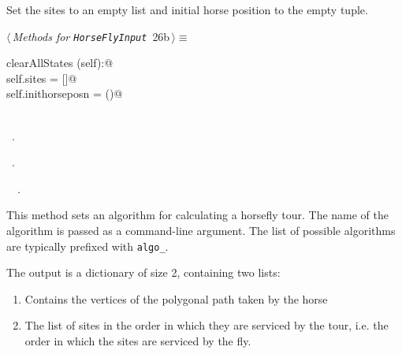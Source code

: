\documentclass[11.5pt]{report}
\begin{document}
\vspace{-0.8cm}
\newchunk Set the sites to an empty list and initial horse position to the empty tuple.
\begin{flushleft} \small\label{scrap31}\raggedright\small
{} $\langle\,${\itshape Methods for \verb|HorseFlyInput|}\nobreak\ {\footnotesize {26b}}$\,\rangle\equiv$
\vspace{-1ex}
\begin{list}{}{} \item
\mbox{}\verb@def clearAllStates (self):@\\
\mbox{}\verb@   self.sites = []@\\
\mbox{}\verb@   self.inithorseposn = ()@\\
\mbox{}\verb@@\\
\mbox{}\verb@@{\NWsep}
\end{list}
\vspace{-1.5ex}
\footnotesize
\begin{list}{}{\setlength{\itemsep}{-\parsep}\setlength{\itemindent}{-\leftmargin}}
\item \NWtxtMacroDefBy\ .
\item \NWtxtMacroRefIn\ .
\item \NWtxtIdentsDefed\nobreak\  \verb@clearAllStates@\nobreak\ .
\item{}
\end{list}
\vspace{4ex}
\end{flushleft}


\vspace{-0.8cm} \newchunk 
This method sets an algorithm for calculating
a horsefly tour. The name of the algorithm is passed as a command-line argument.  
The list of possible algorithms are typically prefixed with \verb|algo_|. 
          
The output is a dictionary of size 2, containing two lists:

\begin{enumerate}
\item  Contains the vertices of the polygonal path taken by the horse
\item  The list of sites in the order in which they are serviced by the tour, 
       i.e. the order in which the sites are serviced by the fly.
\end{enumerate}
\end{document}
